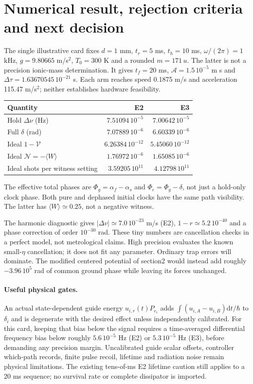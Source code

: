 \documentclass[11pt,a4paper]{article}
\newcommand{\dd}{\mathrm d}
\begin{document}
\newpage
\section{Numerical result, rejection criteria and next decision}
The single illustrative card fixes $d=1$ mm, $t_r=5$ ms, $t_h=10$ ms,
$\omega/(2\pi)=1$ kHz, $g=9.80665$ m/s$^2$, $T_0=300$ K and a rounded
$m=171\,u$. The latter is not a precision ionic-mass determination.
It gives $t_f=20$ ms, $\mathcal A=1.5\,10^{-5}$ m s and
$\Delta\tau=1.63670545\,10^{-21}$ s. Each arm reaches speed 0.1875 m/s
and acceleration 115.47 m/s$^2$; neither establishes hardware feasibility.
\begin{center}
\begin{tabular}{lrr}
\toprule
Quantity & E2 & E3\\
\midrule
Hold $\Delta\nu$ (Hz) & $7.51094\,10^{-5}$ & $7.00642\,10^{-5}$\\
Full $\delta$ (rad) & $7.07889\,10^{-6}$ & $6.60339\,10^{-6}$\\
Ideal $1-\mathcal V$ & $6.26384\,10^{-12}$ & $5.45060\,10^{-12}$\\
Ideal $\mathcal N=-\langle W\rangle$ & $1.76972\,10^{-6}$ & $1.65085\,10^{-6}$\\
Ideal shots per witness setting & $3.59205\,10^{11}$ & $4.12798\,10^{11}$\\
\bottomrule
\end{tabular}
\end{center}
The effective total phases are $\Phi_g=\alpha_f-\alpha_s$ and
$\Phi_e=\Phi_g-\delta$, not just a hold-only clock phase. Both pure
and dephased initial clocks have the same path visibility. The latter
has $\langle W\rangle\simeq0.25$, not a negative witness.

The harmonic diagnostic gives $|\Delta v|\simeq7.0\,10^{-23}$ m/s
(E2), $1-r\simeq5.2\,10^{-40}$ and a phase correction of order
$10^{-30}$ rad. These tiny numbers are cancellation checks in a perfect
model, not metrological claims. High precision evaluates the known
small-$\eta$ cancellation; it does not fit any parameter. Ordinary trap
errors will dominate. The modified centered potential of section2 would
instead add roughly $-3.96\,10^5$ rad of common ground phase while
leaving its forces unchanged.

\paragraph{Useful physical gates.}
An actual state-dependent guide energy $u_{i,r}(t)P_{e_i}$ adds
$\int(u_{i,A}-u_{i,B})\dd t/\hbar$ to $\delta_i$ and is degenerate
with the desired effect unless independently calibrated. For this card,
keeping that bias below the signal requires a time-averaged differential
frequency bias below roughly $5.6\,10^{-5}$ Hz (E2) or
$5.3\,10^{-5}$ Hz (E3), before demanding any precision margin.
Uncalibrated guide scalar offsets, controller which-path records, finite
pulse recoil, lifetime and radiation noise remain physical limitations.
The existing tens-of-ms E2 lifetime caution still applies to a 20 ms
sequence; no survival rate or complete dissipator is imported.
\end{document}
